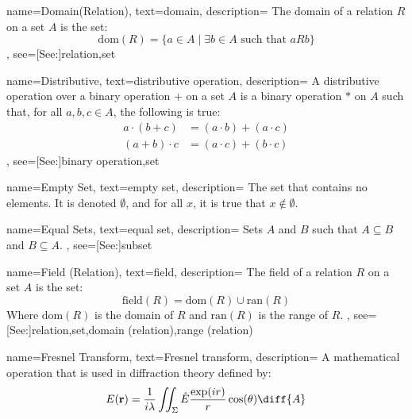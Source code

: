 {
    name={Domain\newline(Relation)},
    text={domain},
    description={
        The domain of a relation $R$ on a set $A$ is the set:
        \begin{equation*}
            \textrm{dom}(R)=\big\{a\in{A}\;|\;\exists{b}\in{A}
                \textrm{ such that }aRb\big\}
        \end{equation*}
    },
    see=[See:]{relation,set}
}

{
    name={Distributive},
    text={distributive operation},
    description={
        A distributive operation over a binary operation $+$ on a set
        $A$ is a binary operation $*$ on $A$ such that, for all
        $a,b,c\in{A}$, the following is true:
        {%
            \begin{align*}
                a\cdot(b+c)&=(a\cdot{b})+(a\cdot{c})\\
                (a+b)\cdot{c}&=(a\cdot{c})+(b\cdot{c})
            \end{align*}
        }%
    },
    see=[See:]{binary operation,set}
}

{
    name={Empty Set},
    text={empty set},
    description={
        The set that contains no elements. It is denoted $\emptyset$, and
        for all $x$, it is true that $x\notin\emptyset$.
    }
}

{
    name={Equal Sets},
    text={equal set},
    description={
        Sets $A$ and $B$ such that $A\subseteq{B}$ and $B\subseteq{A}$.
    },
    see=[See:]{subset}
}

{
    name={Field (Relation)},
    text={field},
    description={
        The field of a relation $R$ on a set $A$ is the set:
        \begin{equation*}
            \textrm{field}(R)=\textrm{dom}(R)\cup\textrm{ran}(R)
        \end{equation*}
        Where $\textrm{dom}(R)$ is the domain of $R$ and $\textrm{ran}(R)$
        is the range of $R$.
    },
    see=[See:]{relation,set,domain (relation),range (relation)}
}

{
    name={Fresnel Transform},
    text={Fresnel transform},
    description={
        A mathematical operation that is used in diffraction theory
        defined by:
        \begin{equation*}
            E(\mathbf{r})=\frac{1}{i\lambda}
                \iint_{\Sigma}\hat{E}\frac{\exp(ir)}{r}
                    \cos(\theta)\diff{A}
        \end{equation*}
    }
}

